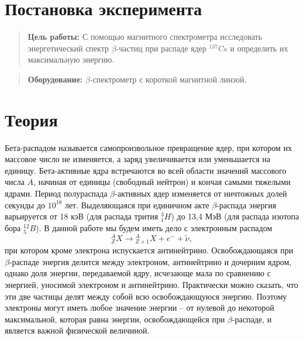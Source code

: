 \documentclass{lab}
\begin{document}

\section*{Постановка эксперимента}

\begin{quote}
	\textbf{{\normalsize Цель работы: }}
	С помощью магнитного спектрометра исследовать энергетический спектр $ \beta $-частиц при распаде ядер $ ^{137} $Cs и определить их максимальную энергию.
\end{quote}

\begin{quote}
	\textbf{{\normalsize Оборудование: }}
	$ \beta $-спектрометр с короткой магнитной линзой.
\end{quote}

\section*{Теория}
	Бета-распадом называется самопроизвольное превращение ядер, при котором их массовое число не изменяется, а заряд увеличивается или уменьшается на единицу. Бета-активные ядра встречаются во всей области значений массового числа $A$, начиная от единицы (свободный нейтрон) и кончая самыми тяжелыми ядрами. Период полураспада $\beta$-активных ядер изменяется от ничтожных долей секунды до $10^{18}$ лет. Выделяющаяся при единичном акте $\beta$-распада энергия варьируется от 18 кэВ (для распада трития ${}_1^3H$) до 13,4 МэВ (для распада изотопа бора ${}_5^{12}B$).
	В данной работе мы будем иметь дело с электронным распадом 
	\begin{equation*}
	{}_Z^AX \longrightarrow {}_{Z+1}^AX + e^{-} + \tilde \nu,
	\end{equation*}
	при котором кроме электрона испускается антинейтрино. Освобождающаяся при $\beta$-распаде энергия делится между электроном, антинейтрино и дочерним ядром, однако доля энергии, передаваемой ядру, исчезающе мала по сравнению с энергией, уносимой электроном и антинейтрино. Практически можно сказать, что эти две частицы делят между собой всю освобождающуюся энергию. Поэтому электроны могут иметь любое значение энергии -- от нулевой до некоторой максимальной, которая равна энергии, освобождающейся при $\beta$-распаде, и является важной физической величиной. 
	
\end{document}

